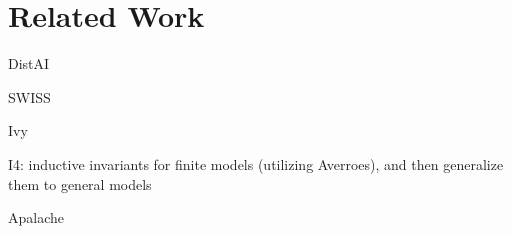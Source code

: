 
\section{Related Work} \label{section:related-work}

DistAI

SWISS

Ivy

I4: inductive invariants for finite models (utilizing Averroes),
and then generalize them to general models

Apalache
